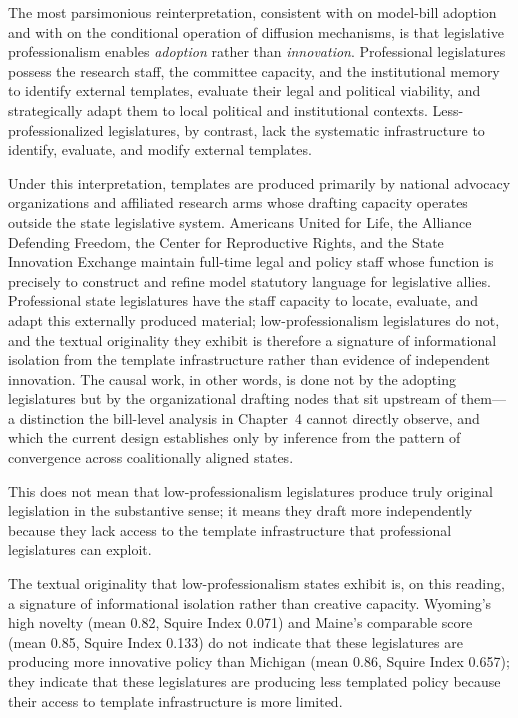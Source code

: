 The most parsimonious reinterpretation, consistent with \textcite{jansaCopyPasteLawmaking2019} on model-bill adoption and with \textcite{shipanMechanismsPolicyDiffusion2008a} on the conditional operation of diffusion mechanisms, is that legislative professionalism enables \emph{adoption} rather than \emph{innovation}. Professional legislatures possess the research staff, the committee capacity, and the institutional memory to identify external templates, evaluate their legal and political viability, and strategically adapt them to local political and institutional contexts. Less-professionalized legislatures, by contrast, lack the systematic infrastructure to identify, evaluate, and modify external templates. 

Under this interpretation, templates are produced primarily by national advocacy organizations and affiliated research arms whose drafting capacity operates outside the state legislative system. Americans United for Life, the Alliance Defending Freedom, the Center for Reproductive Rights, and the State Innovation Exchange maintain full-time legal and policy staff whose function is precisely to construct and refine model statutory language for legislative allies. Professional state legislatures have the staff capacity to locate, evaluate, and adapt this externally produced material; low-professionalism legislatures do not, and the textual originality they exhibit is therefore a signature of informational isolation from the template infrastructure rather than evidence of independent innovation. The causal work, in other words, is done not by the adopting legislatures but by the organizational drafting nodes that sit upstream of them---a distinction the bill-level analysis in Chapter~4 cannot directly observe, and which the current design establishes only by inference from the pattern of convergence across coalitionally aligned states.

This does not mean that low-professionalism legislatures produce truly original legislation in the substantive sense; it means they draft more independently because they lack access to the template infrastructure that professional legislatures can exploit.

The textual originality that low-professionalism states exhibit is, on this reading, a signature of informational isolation rather than creative capacity. Wyoming's high novelty (mean 0.82, Squire Index 0.071) and Maine's comparable score (mean 0.85, Squire Index 0.133) do not indicate that these legislatures are producing more innovative policy than Michigan (mean 0.86, Squire Index 0.657); they indicate that these legislatures are producing less templated policy because their access to template infrastructure is more limited.

